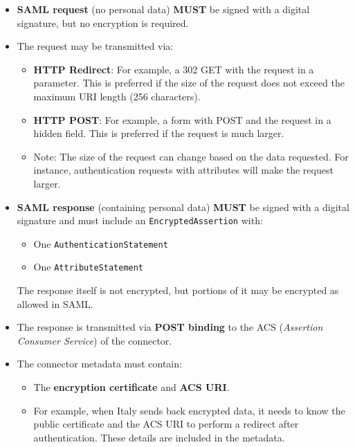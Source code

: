 \begin{itemize}
    \item \textbf{SAML request} (no personal data) \textbf{MUST} be
      signed with a digital signature, but no encryption is required.
    \item The request may be transmitted via:
    \begin{itemize}
        \item \textbf{HTTP Redirect}: For example, a 302 GET with the
          request in a parameter. This is preferred if the size of the
          request does not exceed the maximum URI length (256
          characters).
        \item \textbf{HTTP POST}: For example, a form with POST and
          the request in a hidden field. This is preferred if the
          request is much larger.
        \item Note: The size of the request can change based on the
          data requested. For instance, authentication requests with
          attributes will make the request larger.
    \end{itemize}
    \item \textbf{SAML response} (containing personal data)
      \textbf{MUST} be signed with a digital signature and must
      include an \texttt{EncryptedAssertion} with:
    \begin{itemize}
        \item One \texttt{AuthenticationStatement}
        \item One \texttt{AttributeStatement}
    \end{itemize}
    The response itself is not encrypted, but portions of it may be
    encrypted as allowed in SAML.
    \item The response is transmitted via \textbf{POST binding} to the
      ACS (\textit{Assertion Consumer Service}) of the connector.
    \item The connector metadata must contain:
    \begin{itemize}
        \item The \textbf{encryption certificate} and \textbf{ACS URI}.
        \item For example, when Italy sends back encrypted data, it
          needs to know the public certificate and the ACS URI to
          perform a redirect after authentication. These details are
          included in the metadata.
    \end{itemize}
\end{itemize}

